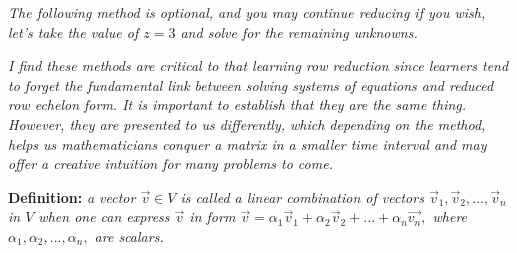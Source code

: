 \documentclass{article}
\begin{document}
		
	\textit{The following method is optional, and you may continue reducing if you wish, let's take the value of $z = 3$ and solve for the remaining unknowns.}
	
	\clearpage
	
	
	
	
	\textit{I find these methods are critical to that learning row reduction since learners tend to forget the fundamental link between solving systems of equations and reduced row echelon form. It is important to establish that they are the same thing. However, they are presented to us differently, which depending on the method, helps us mathematicians conquer a matrix in a smaller time interval and may offer a creative intuition for many problems to come.}
	
	
	\textbf{Definition:}
	\textit{a vector $\Vec{v} \in V$ is called a linear combination of vectors $\vec{v}_{{1}}, \vec{v}_{{2}}, ..., \vec{v}_{{n}}$ in $V$  when one can express $\vec{v}$ in form $\vec{v} = \alpha_{{1}}\vec{v}_{{1}} + \alpha_{{2}}\Vec{v}_{{2}} + ... + \alpha_{{n}}\Vec{v_{{n}}},$ where $\alpha_{{1}}, \alpha_{{2}}, ..., \alpha_{{n}}, $ are scalars.} %
	
	
	
\end{document}
